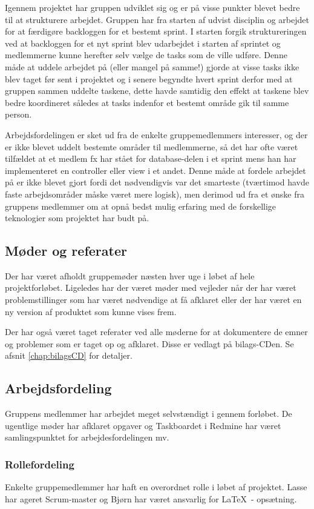 Igennem projektet har gruppen udviklet sig og er på visse punkter blevet bedre til at strukturere arbejdet. Gruppen har fra starten af udvist disciplin og arbejdet for at færdigøre backloggen for et bestemt sprint. I starten forgik struktureringen ved at backloggen for et nyt sprint blev udarbejdet i starten af sprintet og medlemmerne kunne herefter selv vælge de tasks som de ville udføre. Denne måde at uddele arbejdet på (eller mangel på samme!) gjorde at visse tasks ikke blev taget før sent i projektet og i senere begyndte hvert sprint derfor med at gruppen sammen uddelte taskene, dette havde samtidig den effekt at taskene blev bedre koordineret således at tasks indenfor et bestemt område gik til samme person. 


Arbejdsfordelingen er sket ud fra de enkelte gruppemedlemmers interesser, og der er ikke blevet uddelt bestemte områder til medlemmerne, så det har ofte været tilfældet at et medlem fx har stået for database-delen i et sprint mens han har implementeret en controller eller view i et andet. Denne måde at fordele arbejdet på er ikke blevet gjort fordi det nødvendigvis var det smarteste (tværtimod havde faste arbejdsområder måske været mere logisk), men derimod ud fra et ønske fra gruppens medlemmer om at opnå bedst mulig erfaring med de forskellige teknologier som projektet har budt på.

\subsection{Møder og referater}
Der har været afholdt gruppemøder næsten hver uge i løbet af hele projektforløbet. Ligeledes har der været møder med vejleder når der har været problemstillinger som har været nødvendige at få afklaret eller der har været en ny version af produktet som kunne vises frem.

Der har også været taget referater ved alle møderne for at dokumentere de emner og problemer som er taget op og afklaret. Disse er vedlagt på bilags-CDen. Se afsnit \ref{chap:bilagsCD} for detaljer.

\subsection{Arbejdsfordeling}
Gruppens medlemmer har arbejdet meget selvstændigt i gennem forløbet. De ugentlige møder har afklaret opgaver og Taskboardet i Redmine har været samlingspunktet for arbejdesfordelingen mv.

\subsubsection{Rollefordeling}
Enkelte gruppemedlemmer har haft en overordnet rolle i løbet af projektet.
Lasse har ageret Scrum-master og Bjørn har været ansvarlig for \LaTeX\ - opsætning.
